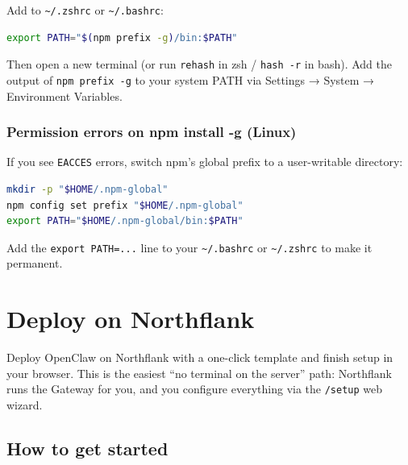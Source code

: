 Add to \texttt{\textasciitilde{}/.zshrc} or \texttt{\textasciitilde{}/.bashrc}:

\begin{lstlisting}[language=bash]
        export PATH="$(npm prefix -g)/bin:$PATH"
\end{lstlisting}


Then open a new terminal (or run \texttt{rehash} in zsh / \texttt{hash -r} in bash).
Add the output of \texttt{npm prefix -g} to your system PATH via Settings → System → Environment Variables.


\subsubsection{Permission errors on npm install -g (Linux)}


If you see \texttt{EACCES} errors, switch npm's global prefix to a user-writable directory:

\begin{lstlisting}[language=bash]
mkdir -p "$HOME/.npm-global"
npm config set prefix "$HOME/.npm-global"
export PATH="$HOME/.npm-global/bin:$PATH"
\end{lstlisting}


Add the \texttt{export PATH=...} line to your \texttt{\textasciitilde{}/.bashrc} or \texttt{\textasciitilde{}/.zshrc} to make it permanent.


\clearpage

\section{Deploy on Northflank}

Deploy OpenClaw on Northflank with a one-click template and finish setup in your browser.
This is the easiest “no terminal on the server” path: Northflank runs the Gateway for you,
and you configure everything via the \texttt{/setup} web wizard.

\subsection{How to get started}


